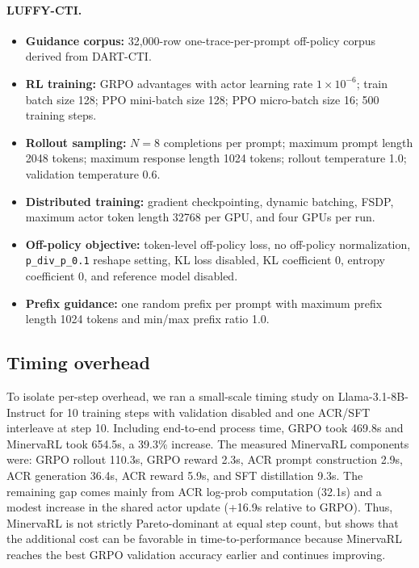 \paragraph{LUFFY-CTI.}
\begin{itemize}
  \item \textbf{Guidance corpus:} 32{,}000-row one-trace-per-prompt off-policy corpus derived from DART-CTI.
  \item \textbf{RL training:} GRPO advantages with actor learning rate $1\times10^{-6}$; train batch size 128; PPO mini-batch size 128; PPO micro-batch size 16; 500 training steps.
  \item \textbf{Rollout sampling:} $N=8$ completions per prompt; maximum prompt length 2048 tokens; maximum response length 1024 tokens; rollout temperature 1.0; validation temperature 0.6.
  \item \textbf{Distributed training:} gradient checkpointing, dynamic batching, FSDP, maximum actor token length 32768 per GPU, and four GPUs per run.
  \item \textbf{Off-policy objective:} token-level off-policy loss, no off-policy normalization, \texttt{p\_div\_p\_0.1} reshape setting, KL loss disabled, KL coefficient 0, entropy coefficient 0, and reference model disabled.
  \item \textbf{Prefix guidance:} one random prefix per prompt with maximum prefix length 1024 tokens and min/max prefix ratio 1.0.
\end{itemize}

\subsection{Timing overhead}
\label{app:timing-overhead}

To isolate per-step overhead, we ran a small-scale timing study on Llama-3.1-8B-Instruct for 10 training steps with validation disabled and one ACR/SFT interleave at step 10.
Including end-to-end process time, GRPO took 469.8s and MinervaRL took 654.5s, a 39.3\% increase.
The measured MinervaRL components were: GRPO rollout 110.3s, GRPO reward 2.3s, ACR prompt construction 2.9s, ACR generation 36.4s, ACR reward 5.9s, and SFT distillation 9.3s.
The remaining gap comes mainly from ACR log-prob computation (32.1s) and a modest increase in the shared actor update (+16.9s relative to GRPO).
Thus, MinervaRL is not strictly Pareto-dominant at equal step count, but  shows that the additional cost can be favorable in time-to-performance because MinervaRL reaches the best GRPO validation accuracy earlier and continues improving.
